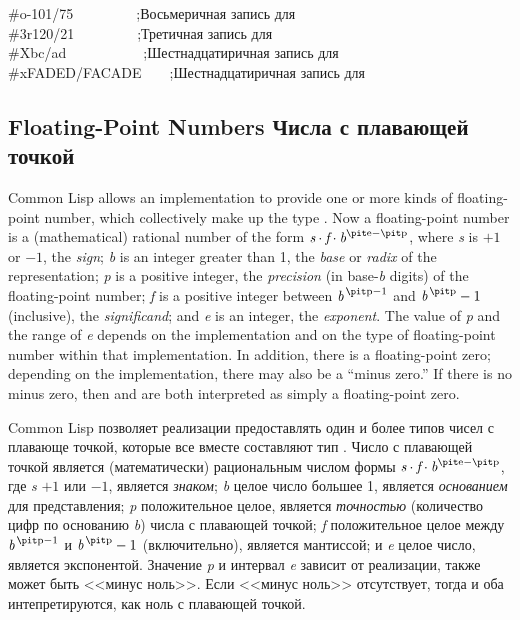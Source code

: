 \begin{lisp}
\#o-101/75~~~~~~~~~;\textrm{Восьмеричная запись для } \\
\#3r120/21~~~~~~~~~;\textrm{Третичная запись для } \\
\#Xbc/ad~~~~~~~~~~~;\textrm{Шестнадцатиричная запись для } \\
\#xFADED/FACADE~~~~;\textrm{Шестнадцатиричная запись для } 
\end{lisp}

\subsection{Floating-Point Numbers Числа с плавающей точкой}

Common Lisp allows an implementation to provide one or more kinds of
floating-point number, which collectively make up the type .
Now a floating-point number is a (mathematical)
rational number of the form
$\emph{s} \cdot \emph{f} \cdot \emph{b}^{\hbox{\scriptsize\it e}-\hbox{\scriptsize\it p}}$,
where \emph{s} is $+1$ or $-1$, the \emph{sign};
\emph{b} is an integer greater than 1,
the \emph{base} or \emph{radix} of the representation;
\emph{p} is a positive integer,
the \emph{precision} (in base-\emph{b} digits) of the floating-point number;
\emph{f} is a positive integer between
$\emph{b}^{\,\hbox{\scriptsize\it p}-1}$ and $\emph{b}^{\,\hbox{\scriptsize\it p}}-1$ (inclusive),
the \emph{significand};
and \emph{e} is an integer, the \emph{exponent}.
The value of \emph{p} and the range of \emph{e}
depends on the implementation and on the type of floating-point number
within that implementation.
In addition, there is a floating-point zero;
depending on the implementation, there may also be a ``minus zero.''
If there is no minus zero, then  and  are
both interpreted as simply a floating-point zero.

Common Lisp позволяет реализации предоставлять один и более типов чисел с
плавающе точкой, которые все вместе составляют тип .
Число с плавающей точкой является (математически) рациональным числом формы
$\emph{s} \cdot \emph{f} \cdot \emph{b}^{\hbox{\scriptsize\it e}-\hbox{\scriptsize\it p}}$,
где \emph{s} $+1$ или $-1$, является \emph{знаком};
\emph{b} целое число большее 1,
является \emph{основанием} для представления;
\emph{p} положительное целое, является \emph{точностью} (количество цифр по
основанию \emph{b}) числа с плавающей точкой;
\emph{f} положительное целое между $\emph{b}^{\,\hbox{\scriptsize\it p}-1}$ и
$\emph{b}^{\,\hbox{\scriptsize\it p}}-1$ (включительно), является мантиссой;
и \emph{e} целое число, является экспонентой.
Значение \emph{p} и интервал \emph{e} зависит от реализации, также может быть
<<минус ноль>>. Если <<минус ноль>> отсутствует, тогда  и  оба
интепретируются, как ноль с плавающей точкой.

